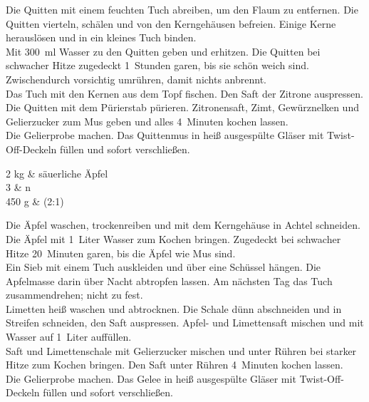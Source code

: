       \begin{zubereitung}
        Die Quitten mit einem feuchten Tuch abreiben, um den Flaum zu
	entfernen. Die Quitten vierteln, schälen und von den Kerngehäusen
	befreien. Einige Kerne herauslösen und in ein kleines Tuch binden. \\
	Mit 300~ml Wasser zu den Quitten geben und erhitzen. Die Quitten bei
	schwacher Hitze zugedeckt 1\breh{}~Stunden garen, bis sie schön weich
	sind. Zwischendurch vorsichtig umrühren, damit nichts anbrennt. \\
	Das Tuch mit den Kernen aus dem Topf fischen. Den Saft der Zitrone
	auspressen. Die Quitten mit dem Pürierstab pürieren. Zitronensaft,
	Zimt, Gewürznelken und Gelierzucker zum Mus geben und alles
	4~Minuten kochen lassen. \\
	Die Gelierprobe machen. Das Quittenmus in heiß ausgespülte Gläser
	mit Twist-Off-Deckeln füllen und sofort verschließen. \\
      \end{zubereitung}


      \begin{zutaten}
        2 kg & säuerliche Äpfel \\
	3 & n \\
	450 g &  (2:1) \\
      \end{zutaten}


      \begin{zubereitung}
        Die Äpfel waschen, trockenreiben und mit dem Kerngehäuse in Achtel
	schneiden. \\
	Die Äpfel mit 1~Liter Wasser zum Kochen bringen. Zugedeckt bei
	schwacher Hitze 20~Minuten garen, bis die Äpfel wie Mus sind. \\
	Ein Sieb mit einem Tuch auskleiden und über eine Schüssel hängen. Die
	Apfelmasse darin über Nacht abtropfen lassen. Am nächsten Tag das Tuch
	zusammendrehen; nicht zu fest. \\
	Limetten heiß waschen und abtrocknen. Die Schale dünn abschneiden und
	in Streifen schneiden, den Saft auspressen. Apfel- und Limettensaft
	mischen und mit Wasser auf 1~Liter auffüllen. \\
	Saft und Limettenschale mit Gelierzucker mischen und unter Rühren bei
	starker Hitze zum Kochen bringen. Den Saft unter Rühren 4~Minuten
	kochen lassen. \\
	Die Gelierprobe machen. Das Gelee in heiß ausgespülte Gläser mit
	Twist-Off-Deckeln füllen und sofort verschließen. \\
      \end{zubereitung}

